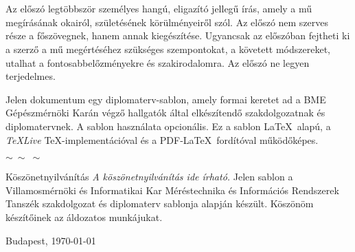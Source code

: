 

\selecthungarian

\chapter*{\eloszo}

Az előszó legtöbbször személyes hangú, eligazító jellegű írás, amely a mű megírásának okairól, születésének körülményeiről szól. Az előszó nem szerves része a főszövegnek, hanem annak kiegészítése.
Ugyancsak az előszóban fejtheti ki a szerző a mű megértéséhez szükséges szempontokat, a követett módszereket, utalhat a fontosabbelőzményekre és szakirodalomra.
Az előszó ne legyen terjedelmes.

\begin{flushleft}
  Jelen dokumentum egy diplomaterv-sablon, amely formai keretet ad a BME Gépészmérnöki Karán végző hallgatók által elkészítendő szakdolgozatnak és diplomatervnek. A sablon használata opcionális. Ez a sablon \LaTeX~alapú, a \emph{TeXLive} \TeX-implementációval és a PDF-\LaTeX~fordítóval működőképes.
\end{flushleft}


\begin{center}
    $\sim \: \sim \: \sim$
\end{center}

\begin{flushleft}
Köszönetnyilvánítás \emph{A köszönetnyilvánítás ide írható.} Jelen sablon a Villamosmérnöki és Informatikai Kar Méréstechnika és Információs Rendszerek Tanszék szakdolgozat és diplomaterv sablonja alapján készült. Köszönöm készítőinek az áldozatos munkájukat.
\end{flushleft}

\vspace{0.5cm}

\begin{flushleft}
{Budapest, \today}
\end{flushleft}

\begin{flushright}
\emph{\szerzo}
\end{flushright}

\vfill
